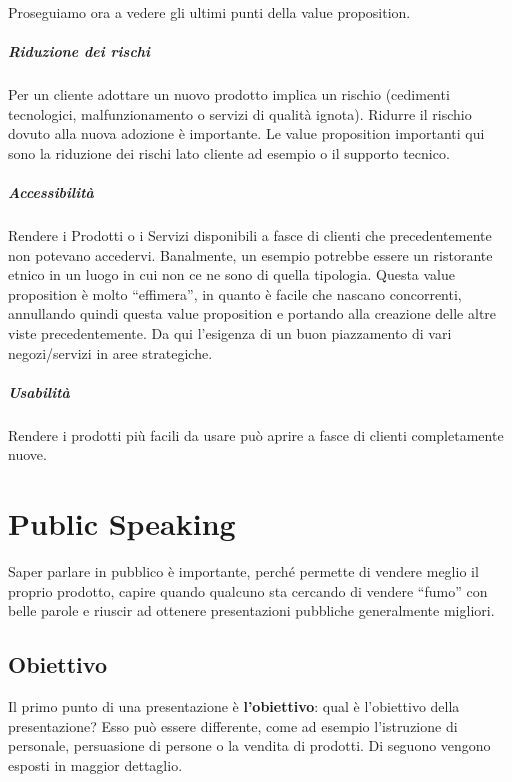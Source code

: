 Proseguiamo ora a vedere gli ultimi punti della value proposition.

\paragraph*{Riduzione dei rischi} Per un cliente adottare un nuovo prodotto
implica un rischio (cedimenti tecnologici, malfunzionamento o servizi di
qualità ignota). Ridurre il rischio dovuto alla nuova adozione è importante.
Le value proposition importanti qui sono la riduzione dei rischi lato cliente
ad esempio o il supporto tecnico.

\paragraph*{Accessibilità} Rendere i Prodotti o i Servizi disponibili a fasce
di clienti che precedentemente non potevano accedervi. Banalmente, un esempio
potrebbe essere un ristorante etnico in un luogo in cui non ce ne sono di
quella tipologia.
Questa value proposition è molto ``effimera'', in quanto è facile che nascano
concorrenti, annullando quindi questa value proposition e portando alla
creazione delle altre viste precedentemente.
Da qui l'esigenza di un buon piazzamento di vari negozi/servizi in aree
strategiche.

\paragraph*{Usabilità} Rendere i prodotti più facili da usare può aprire a
fasce di clienti completamente nuove.


\chapter{Public Speaking}

Saper parlare in pubblico è importante, perché permette di vendere meglio il
proprio prodotto, capire quando qualcuno sta cercando di vendere ``fumo'' con
belle parole e riuscir ad ottenere presentazioni pubbliche generalmente
migliori.

\section{Obiettivo}

Il primo punto di una presentazione è \textbf{l'obiettivo}: qual è l'obiettivo
della presentazione? Esso può essere differente, come ad esempio l'istruzione
di personale, persuasione di persone o la vendita di prodotti. Di seguono
vengono esposti in maggior dettaglio.

